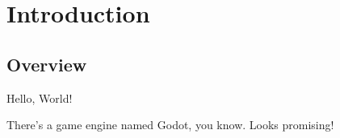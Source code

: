 \chapter{Introduction}
\section{Overview}

Hello, World!

There's a game engine named Godot\cite{godot}, you know. Looks promising!
